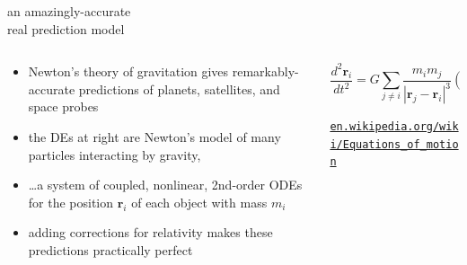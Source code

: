 \documentclass{beamer}
\begin{document}
\begin{frame}{an amazingly-accurate \\ real prediction model}

\begin{columns}
\begin{column}{0.55\textwidth}
\begin{itemize}
\item Newton's theory of gravitation gives remarkably-accurate predictions of planets, satellites, and space probes
\item the DEs at right are Newton's model of many particles interacting by gravity,
\item \dots a system of coupled, nonlinear, 2nd-order ODEs for the position $\mathbf{r}_i$ of each object with mass $m_i$
\item adding corrections for relativity makes these predictions practically perfect
\end{itemize}
\end{column}
\begin{column}{0.45\textwidth}
$$\frac{d^2 \mathbf{r}_i}{dt^2} = G \sum_{j\ne i} \frac{m_i m_j}{|\mathbf{r}_j - \mathbf{r}_i|^3} (\mathbf{r}_j - \mathbf{r}_i)$$

\medskip

\quad \tiny \href{https://en.wikipedia.org/wiki/Equations_of_motion}{\texttt{en.wikipedia.org/wiki/Equations\_of\_motion}}
\end{column}
\end{columns}
\end{frame}
\end{document}
